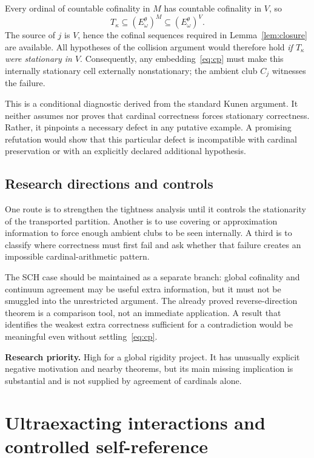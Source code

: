 \documentclass[11pt,letterpaper]{article}
\theoremstyle{definition}
\newcommand{\Priority}[1]{\textbf{Research priority.} #1}
\begin{document}
Every ordinal of countable cofinality in $M$ has countable cofinality in $V$, so
\[
 T_\kappa\subseteq(E^\theta_\omega)^M\subseteq(E^\theta_\omega)^V.
\]
The source of $j$ is $V$, hence the cofinal sequences required in Lemma~\ref{lem:closure} are available. All hypotheses of the collision argument would therefore hold \emph{if $T_\kappa$ were stationary in $V$}. Consequently, any embedding~\eqref{eq:cp} must make this internally stationary cell externally nonstationary; the ambient club $C_j$ witnesses the failure.

This is a conditional diagnostic derived from the standard Kunen argument. It neither assumes nor proves that cardinal correctness forces stationary correctness. Rather, it pinpoints a necessary defect in any putative example. A promising refutation would show that this particular defect is incompatible with cardinal preservation or with an explicitly declared additional hypothesis.

\subsection{Research directions and controls}

One route is to strengthen the tightness analysis until it controls the stationarity of the transported partition. Another is to use covering or approximation information to force enough ambient clubs to be seen internally. A third is to classify where correctness must first fail and ask whether that failure creates an impossible cardinal-arithmetic pattern.

The SCH case should be maintained as a separate branch: global cofinality and continuum agreement may be useful extra information, but it must not be smuggled into the unrestricted argument. The already proved reverse-direction theorem is a comparison tool, not an immediate application. A result that identifies the weakest extra correctness sufficient for a contradiction would be meaningful even without settling~\eqref{eq:cp}.

\Priority{High for a global rigidity project. It has unusually explicit negative motivation and nearby theorems, but its main missing implication is substantial and is not supplied by agreement of cardinals alone.}

\section{Ultraexacting interactions and controlled self-reference}\label{sec:ultra}
\end{document}
